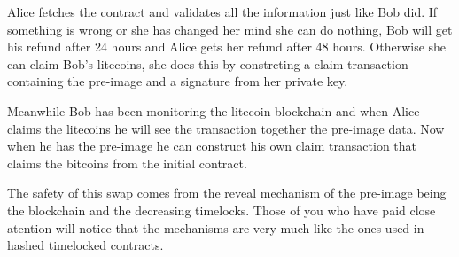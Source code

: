 Alice fetches the contract and validates all the information just like
Bob did. If something is wrong or she has changed her mind she can do nothing,
Bob will get his refund after 24 hours and Alice gets her refund after 48 hours.
Otherwise she can claim Bob's litecoins, she does this by constrcting a claim
transaction containing the pre-image and a signature from her private key. 

Meanwhile Bob has been monitoring the litecoin blockchain and when Alice claims the
litecoins he will see the transaction together the pre-image data. Now when he has
the pre-image he can construct his own claim transaction that claims the bitcoins 
from the initial contract. 

The safety of this swap comes from the reveal mechanism of the pre-image being
the blockchain and the decreasing timelocks. Those of you who have paid close
atention will notice that the mechanisms are very much like the ones used in hashed
timelocked contracts. 


